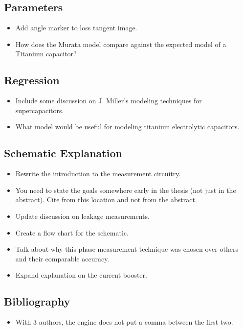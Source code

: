 \documentclass{article}
\begin{document}
\subsection{Parameters}
\begin{itemize}
    \item Add angle marker to loss tangent image.
    \item How does the Murata model compare against the expected model of a Titanium capacitor?
\end{itemize}

\subsection{Regression}
\begin{itemize}
    \item Include some discussion on J. Miller's modeling techniques for supercapacitors.
    \item What model would be useful for modeling titanium electrolytic capacitors.
\end{itemize}

\subsection{Schematic Explanation}
\begin{itemize}
    \item Rewrite the introduction to the measurement circuitry.
    \item You need to state the goals somewhere early in the thesis (not just in the abstract). Cite from this location and not from the abstract.
    \item Update discussion on leakage measurements.
    \item Create a flow chart for the schematic.
    \item Talk about why this phase measurement technique was chosen over others and their comparable accuracy.
    \item Expand explanation on the current booster.
\end{itemize}

\subsection{Bibliography}
\begin{itemize}
    \item With 3 authors, the engine does not put a comma between the first two.
\end{itemize}


\end{document}
